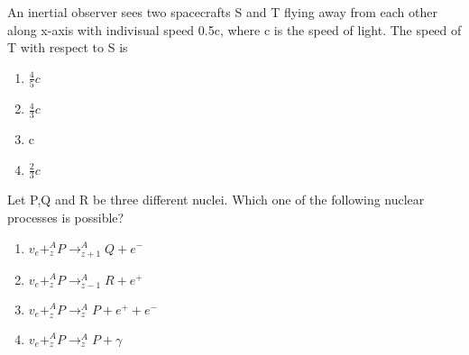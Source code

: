 \item An inertial observer sees two spacecrafts S and T flying away from each other along x-axis with indivisual speed 0.5c, where c is the speed of light. The speed of T with respect to S is
\begin{enumerate}
    \item $\frac{4}{5}c$
    \item $\frac{4}{3}c$
    \item c
    \item $\frac{2}{3}c$
\end{enumerate}
\item Let P,Q and R be three different nuclei. Which one of the following nuclear processes is possible?
\begin{enumerate}
    \item $v_e+^{A}_{z}P \rightarrow ^{A}_{z+1}Q+e^-$
     \item $v_e+^{A}_{z}P \rightarrow ^{A}_{z-1}R+e^+$
      \item $v_e+^{A}_{z}P \rightarrow ^{A}_{z}P+e^++e^-$
    \item $v_e+^{A}_{z}P \rightarrow ^{A}_{z}P+\gamma$   
\end{enumerate}




